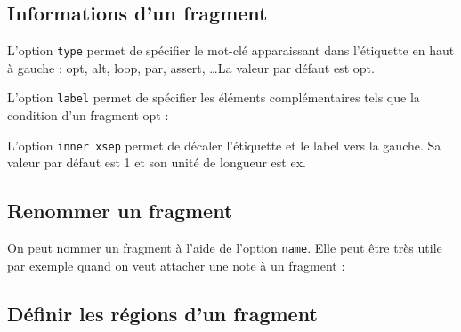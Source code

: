 \documentclass[a4paper,11pt]{report}
\newcommand{\inputTikZ}[1]{%
  }%
\newcommand{\inputTikZ}[1]{%
    \texttt{[image: fig/\#1.pdf]}%
  }%
\begin{document}
\subsection{Informations d'un fragment}\label{ss.fraginfos}

L'option {\tt type} permet de spécifier le mot-clé apparaissant dans l'étiquette en haut à gauche : opt, alt, loop, par, assert, \ldots La valeur par défaut est opt.

L'option {\tt label} permet de spécifier les éléments complémentaires tels que la condition d'un fragment opt : 

\medskip

\begin{minipage}{0.5\textwidth}

\end{minipage}
\begin{minipage}{0.5\textwidth}
\begin{center}
\inputTikZ{fragmentlabel}
\end{center}
\end{minipage}

\medskip

L'option {\tt inner xsep} permet de décaler l'étiquette et le label vers la gauche. Sa valeur par défaut est 1 et son unité de longueur est ex.

\subsection{Renommer un fragment}\label{ss.fragname}

On peut nommer un fragment à l'aide de l'option {\tt name}. Elle peut être très utile par exemple quand on veut attacher une note à un fragment :

\medskip

\begin{minipage}{0.5\textwidth}

\end{minipage}
\begin{minipage}{0.5\textwidth}
\begin{center}
\inputTikZ{fragmentname}
\end{center}
\end{minipage}

\subsection{Définir les régions d'un fragment}\label{ss.fragpart}
\end{document}
